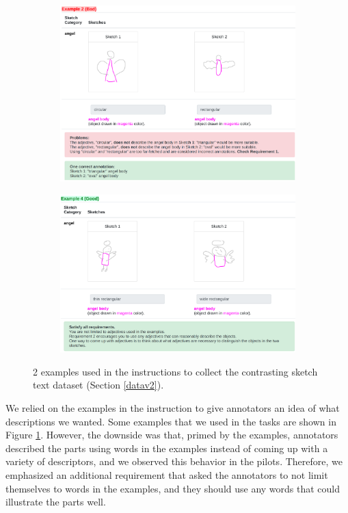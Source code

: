 \begin{figure}[!htb]
\begin{subfigure}{\textwidth}
  \centering
  \includegraphics[width=0.8\linewidth]{data_collection/version2/v2example2.png}  
\end{subfigure}
\newline
\vspace{5mm}
\begin{subfigure}{\textwidth}
  \centering
  \includegraphics[width=0.8\linewidth]{data_collection/version2/v2example1.png}  
\end{subfigure}
\caption{2 examples used in the instructions to collect the contrasting sketch text dataset (Section \ref{datav2}).}
\label{v2.examples}
\end{figure}

We relied on the examples in the instruction to give annotators an idea of what descriptions we wanted. 
Some examples that we used in the tasks are shown in Figure \ref{v2.examples}.
However, the downside was that, primed by the examples, annotators described the parts using words in the examples instead of coming up with a variety of descriptors, and we observed this behavior in the pilots. 
Therefore, we emphasized an additional requirement that asked the annotators to not limit themselves to words in the examples, and they should use any words that could illustrate the parts well. 

